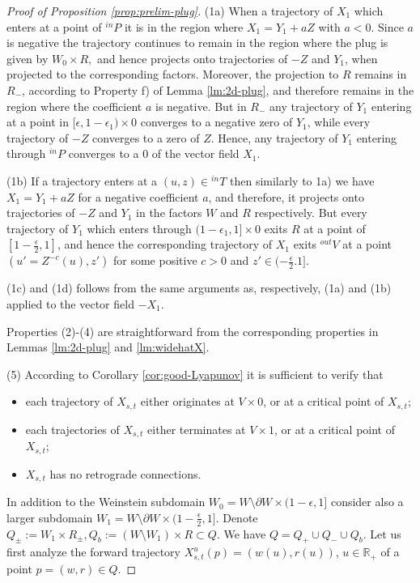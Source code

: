 \documentclass[10pt,a4paper]{amsart}
\newcommand{\R}{\mathbb{R}}
\newcommand{\eps}{\epsilon}
\newcommand{\p}{\partial}
\begin{document}
\begin{proof}[Proof of Proposition \ref{prop:prelim-plug}]
(1a) When a   trajectory  of $X_1$ which enters at a point of  $ {}^{in}P$ it is in  the region where  $X_1=Y_1 + a Z$ with $a<0$. Since $a$ is negative the trajectory continues to remain in the region where the plug is given by $ W_0\times R,$  and hence projects onto trajectories of $-Z$ and $Y_1$, when projected to the corresponding factors. Moreover, the projection to $R$ remains in $R_-$, according to Property f) of Lemma \ref{lm:2d-plug}, 
 and therefore remains  in the region where the coefficient $a$ is negative.
 But in $R_-$ any trajectory of $Y_1$ entering at a point in $[\eps,1-\eps_1)\times 0$ converges to a negative  zero of $Y_1$, while every trajectory of $-Z$ converges to a zero of $Z$. Hence, any trajectory of $Y_1$ 
 entering through $ {}^{in}P$ converges to a $0$ of the vector field $X_1$.
 \medskip
 
 (1b)
  If a trajectory enters  at a  $(u, z)\in{}^{in}T  $ then similarly to 1a) we have  $X_1=Y_1+aZ$ for a negative coefficient $a$, and therefore, it projects    onto trajectories of $-Z$ and $Y_1$ in the factors $W$ and $R$ respectively. But every trajectory of $Y_1$ which enters through $(1-\eps_1,1]\times 0$ exits $R$ at a point of $[1-\frac\eps2,1]$, and hence the corresponding trajectory of $X_1$ exits ${}^{out}V$ at a point $(u'=Z^{-c}(u), z')$ for some positive $c>0$ and $z'\in(-\frac\eps2.1]$.
  \medskip
  
 (1c) and (1d) follows from the same arguments as, respectively, (1a) and (1b) applied to the vector field $-X_1$.
 
 \medskip
 Properties (2)-(4) are straightforward from the corresponding properties in Lemmas \ref{lm:2d-plug} and  \ref{lm:widehatX}.
 
(5) According to  Corollary \ref{cor:good-Lyapunov} it is sufficient to verify that
\begin{itemize}
\item each trajectory of $X_{s,t}$  either originates at $V\times 0$, or at a critical point of $X_{s,t}$;
\item  each trajectories of $X_{s,t}$  either terminates at $V\times 1$, or at a critical point of $X_{s,t}$;
\item $X_{s,t}$ has no retrograde connections.
\end{itemize}
In addition to the Weinstein subdomain $W_0=W\setminus\p W\times(1-\eps,1]$ consider also a larger subdomain  $W_1=W\setminus\p W\times(1-\frac\eps2,1]$.
Denote $Q_\pm:=W_1\times R_\pm,  Q_b:=(W\setminus W_1)\times R\subset Q.$  We have $Q=Q_+\cup Q_-\cup Q_b$.
Let us first analyze  the forward trajectory $X_{s,t}^u(p)=(w(u),r(u))$, $u\in\R_+$ of a  point 
 $p=(w,r)\in Q$. 
 

\end{proof}
\end{document}
